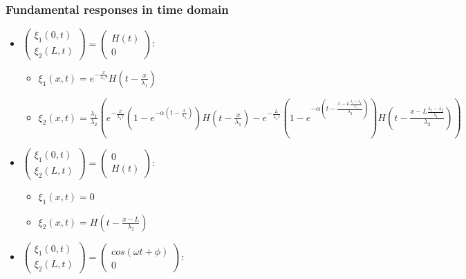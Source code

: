 \documentclass[preprint]{elsarticle}
\begin{document}
\subsubsection{Fundamental responses in time domain}
\begin{itemize}
\item $\left(\begin{array}{c}
\xi_{1}\left(0,t\right)\\
\xi_{2}\left(L,t\right)
\end{array}\right)=\left(\begin{array}{c}
H\left(t\right)\\
0
\end{array}\right)$:

\begin{itemize}
\item $\xi_{1}\left(x,t\right)=e^{-\frac{x}{\lambda_{1}\tau}}H\left(t-\frac{x}{\lambda_{1}}\right)$
\item $\xi_{2}\left(x,t\right)=\frac{\lambda_{1}}{\lambda_{2}}\left(e^{-\frac{x}{\lambda_{1}\tau}}\left(1-e^{-\alpha\left(t-\frac{x}{\lambda_{1}}\right)}\right)H\left(t-\frac{x}{\lambda_{1}}\right)-e^{-\frac{L}{\lambda_{1}\tau}}\left(1-e^{-\alpha\left(t-\frac{x-L\frac{\lambda_{1}-\lambda_{2}}{\lambda_{1}}}{\lambda_{2}}\right)}\right)H\left(t-\frac{x-L\frac{\lambda_{1}-\lambda_{2}}{\lambda_{1}}}{\lambda_{2}}\right)\right)$
\end{itemize}
\item $\left(\begin{array}{c}
\xi_{1}\left(0,t\right)\\
\xi_{2}\left(L,t\right)
\end{array}\right)=\left(\begin{array}{c}
0\\
H\left(t\right)
\end{array}\right)$:

\begin{itemize}
\item $\xi_{1}\left(x,t\right)=0$
\item $\xi_{2}\left(x,t\right)=H\left(t-\frac{x-L}{\lambda_{2}}\right)$
\end{itemize}
\item $\left(\begin{array}{c}
\xi_{1}\left(0,t\right)\\
\xi_{2}\left(L,t\right)
\end{array}\right)=\left(\begin{array}{c}
cos\left(\omega t+\phi\right)\\
0
\end{array}\right)$:


\end{itemize}
\end{document}
